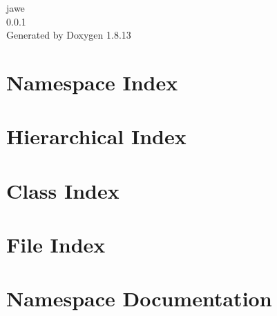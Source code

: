 \documentclass[twoside]{book}
\newcommand{\+}{\discretionary{\mbox{\scriptsize$\hookleftarrow$}}{}{}}
\newcommand{\clearemptydoublepage}{%
  \newpage{\pagestyle{empty}\cleardoublepage}%
}
\begin{document}
\hypersetup{pageanchor=false,
             bookmarksnumbered=true,
             pdfencoding=unicode
            }
\begin{titlepage}
\vspace*{7cm}
\begin{center}%
{\Large jawe \\[1ex]\large 0.\+0.\+1 }\\
\vspace*{1cm}
{\large Generated by Doxygen 1.8.13}\\
\end{center}
\end{titlepage}
\clearemptydoublepage
{}
\tableofcontents
\clearemptydoublepage
{}
\hypersetup{pageanchor=true}

\chapter{Namespace Index}

\chapter{Hierarchical Index}

\chapter{Class Index}

\chapter{File Index}

\chapter{Namespace Documentation}


\end{document}
